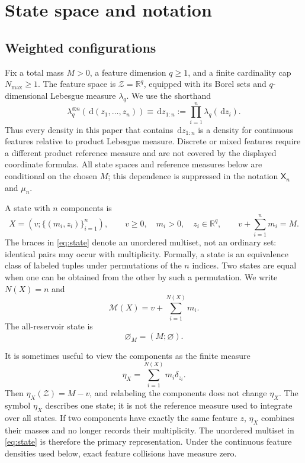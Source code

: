 \documentclass[10pt]{article}
\theoremstyle{definition}
\theoremstyle{remark}
\newcommand{\R}{\mathbb{R}}
\newcommand{\dd}{\,\mathrm{d}}
\newcommand{\emptyconfig}{\varnothing_M}
\newcommand{\state}{\mathsf{X}}
\begin{document}
\section{State space and notation}
\label{sec:state}

\subsection{Weighted configurations}

Fix a total mass $M>0$, a feature dimension $q\geq 1$, and a finite
cardinality cap $N_{\max}\geq1$.  The feature space is
$\mathcal Z=\R^q$, equipped with its Borel sets and $q$-dimensional
Lebesgue measure $\lambda_q$.  We use the shorthand
\begin{equation}
  \lambda_q^{\otimes n}(\dd(z_1,\ldots,z_n))
  \equiv\dd z_{1:n}
  :=\prod_{i=1}^n\lambda_q(\dd z_i).
  \label{eq:feature-reference-measure}
\end{equation}
Thus every density in this paper that contains $\dd z_{1:n}$ is a density
for continuous features relative to product Lebesgue measure.  Discrete or
mixed features require a different product reference measure and are not
covered by the displayed coordinate formulas.
All state spaces and reference measures below are conditional on the chosen
$M$; this dependence is suppressed in the notation $\state_n$ and $\mu_n$.

A state with $n$ components is
\begin{equation}
  X=\left(v;\{(m_i,z_i)\}_{i=1}^{n}\right),
  \qquad
  v\geq 0,\quad m_i>0,\quad z_i\in\R^q,
  \qquad v+\sum_{i=1}^{n}m_i=M.
  \label{eq:state}
\end{equation}
The braces in \eqref{eq:state} denote an unordered multiset, not an ordinary
set: identical pairs may occur with multiplicity.  Formally, a state is an
equivalence class of labeled tuples under permutations of the $n$ indices.
Two states are equal when one can be obtained from the other by such a
permutation.  We write $N(X)=n$ and
\begin{equation}
  \mathcal{M}(X)=v+\sum_{i=1}^{N(X)}m_i.
\end{equation}
The all-reservoir state is
\begin{equation}
  \emptyconfig=(M;\varnothing).
\end{equation}

It is sometimes useful to view the components as the finite measure
\begin{equation}
  \eta_X=\sum_{i=1}^{N(X)}m_i\delta_{z_i}.
  \label{eq:finite-measure}
\end{equation}
Then $\eta_X(\mathcal Z)=M-v$, and relabeling the components does not change
$\eta_X$.  The symbol $\eta_X$ describes one state; it is not the reference
measure used to integrate over all states.  If two components have exactly
the same feature $z$, $\eta_X$ combines their masses and no longer records
their multiplicity.  The unordered multiset in \eqref{eq:state} is therefore
the primary representation.  Under the continuous feature densities used
below, exact feature collisions have measure zero.
\end{document}
